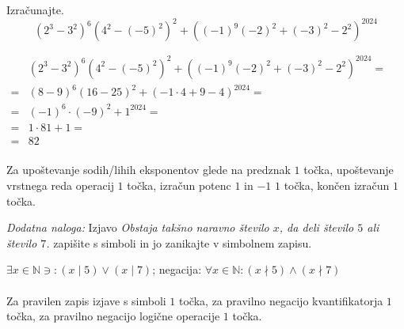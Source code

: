 \documentclass[addpoints]{exam}
\begin{document}
\begin{questions}
        

    \question[4]
    Izračunajte. $$ \left(2^3-3^2\right)^6\left(4^2-(-5)^2\right)^2+\left((-1)^9(-2)^2+(-3)^2-2^2\right)^{2024}$$
    \begin{solution}[5cm]
        $\begin{aligned}
            &(2^3-3^2)^6(4^2-(-5)^2)^2+((-1)^9(-2)^2+(-3)^2-2^2)^{2024}= \\
                =& (8-9)^6(16-25)^2+(-1\cdot 4+9-4)^{2024}=\\
                =& (-1)^6\cdot(-9)^2+1^{2024}= \\
                =& 1\cdot 81+1= \\
                =& 82
        \end{aligned} $ \\ \\
        Za upoštevanje sodih/lihih eksponentov glede na predznak $1$ točka, upoštevanje vrstnega reda operacij $1$ točka, izračun potenc $1$ in $-1$ $1$ točka, končen izračun $1$ točka.
\end{solution}

    
    \bonusquestion[3]
    \textit{Dodatna naloga:} Izjavo \textit{Obstaja takšno naravno število $x$, da deli število $5$ ali število $7$.} zapišite s simboli in jo zanikajte v simbolnem zapisu.
    
    \begin{solution}
        $\exists x\in\mathbb{N}\ni:(x\mid 5)\lor(x\mid 7)$; negacija: $\forall x\in\mathbb{N}: (x\nmid 5)\land(x\nmid 7)$ \\ \\
        Za pravilen zapis izjave s simboli $1$ točka, za pravilno negacijo kvantifikatorja $1$ točka, za pravilno negacijo logične operacije $1$ točka.
    \end{solution}

\end{questions}
\end{document}
